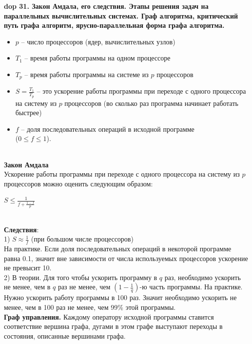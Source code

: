 \textbf{\LARGE dop 31. Закон Амдала, его следствия. Этапы решения задач на параллельных вычислительных системах. Граф алгоритма, критический путь графа алгоритм, ярусно-параллельная форма графа алгоритма.}\\

\begin{itemize}
    \item $p$ – число процессоров (ядер, вычислительных узлов)
    \item $T_{1}$ – время работы программы на одном процессоре
    \item $T_{p}$ – время работы программы на системе из $p$ процессоров
    \item $S = \frac{T_{1}}{T_{p}}$ – это ускорение работы программы при переходе с одного процессора на систему из $p$ процессоров (во сколько раз
программа начинает работать быстрее)
    \item $f$ – доля последовательных операций в исходной программе\\
    ($0 \leq f \leq 1$).
\end{itemize}\\

\textbf{Закон Амдала}\\
Ускорение работы программы при переходе с одного процессора на систему из $p$ процессоров можно оценить следующим образом:
\begin{center}
$S \leq \frac{1}{f + \frac{1 - f}{p}}$
\end{center}\\

\textbf{Следствия}:\\
1) $S \approx \frac{1}{f}$ (при большом числе процессоров)\\
На практике. Если доля последовательных операций в некоторой программе равна 0.1, значит вне зависимости от числа используемых процессоров ускорение не превысит 10.\\

2) В теории. Для того чтобы ускорить программу в $q$ раз, необходимо ускорить не менее, чем в $q$ раз не менее, чем $(1-\frac{1}{q})$-ю часть программы.
На практике. Нужно ускорить работу программы в 100 раз. Значит необходимо ускорить не менее, чем в 100 раз не менее, чем 99\% этой программы.\\

\textbf{Граф управления.} Каждому оператору исходной программы ставится соответствие вершина графа, дугами в этом графе выступают переходы в состояния, описанные вершинами графа.\\


